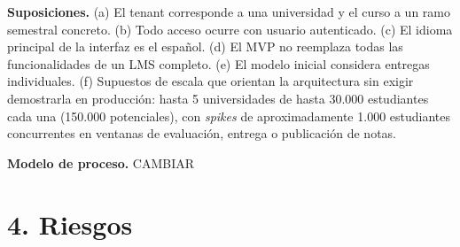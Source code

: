 \documentclass[letterpaper,10pt]{article}
\begin{document}
\textbf{Suposiciones.} (a) El tenant corresponde a una universidad y el curso a un ramo semestral concreto. (b) Todo acceso ocurre con usuario autenticado. (c) El idioma principal de la interfaz es el español. (d) El MVP no reemplaza todas las funcionalidades de un LMS completo. (e) El modelo inicial considera entregas individuales. (f) Supuestos de escala que orientan la arquitectura sin exigir demostrarla en producción: hasta 5 universidades de hasta 30.000 estudiantes cada una (150.000 potenciales), con \emph{spikes} de aproximadamente 1.000 estudiantes concurrentes en ventanas de evaluación, entrega o publicación de notas.

\textbf{Modelo de proceso.} CAMBIAR

\section{4. Riesgos}
\end{document}
